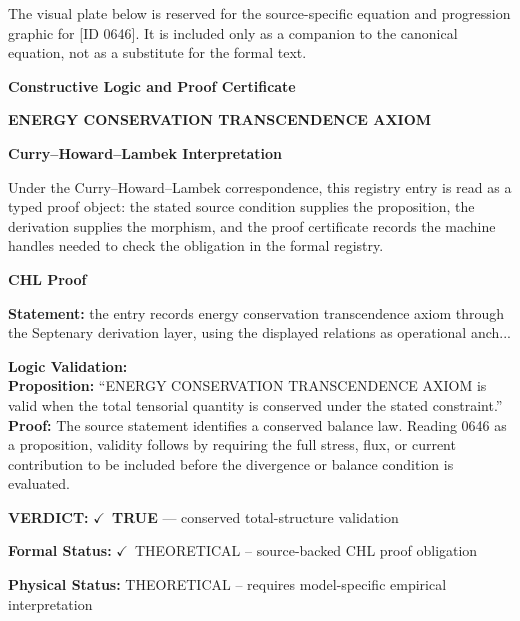 \begingroup\footnotesize\sloppy
The visual plate below is reserved for the source-specific equation and progression graphic for [ID 0646]. It is included only as a companion to the canonical equation, not as a substitute for the formal text.
\par\endgroup
\ifTZPDarkEdition
{}
\fi

\clearpage
\begingroup\tzpsupportsetup
\noindent\textbf{\fontsize{10.8pt}{12.8pt}\selectfont [ID 0646] Constructive Logic and Proof Certificate}\par
\noindent\textbf{\fontsize{10pt}{12pt}\selectfont ENERGY CONSERVATION TRANSCENDENCE AXIOM}\par
\vspace{0.45em}
\begingroup
\footnotesize
\setlength{\parskip}{0.22em}
\setlength{\parindent}{0pt}
\noindent\textbf{Curry--Howard--Lambek Interpretation}\par
Under the Curry--Howard--Lambek correspondence, this registry entry is read as a typed proof
object: the stated source condition supplies the proposition, the derivation supplies the
morphism, and the proof certificate records the machine handles needed to check the obligation
in the formal registry.

\vspace{0.45em}
\noindent\textbf{CHL Proof}\par
\textbf{Statement:} the entry records energy conservation transcendence axiom through the Septenary
derivation layer, using the displayed relations as operational anch...

\textbf{Logic Validation:}\\
\textbf{Proposition:} ``ENERGY CONSERVATION TRANSCENDENCE AXIOM is valid when the total tensorial quantity is
conserved under the stated constraint.''\\
\textbf{Proof:} The source statement identifies a conserved balance law. Reading 0646 as a proposition,
validity follows by requiring the full stress, flux, or current contribution to be
included before the divergence or balance condition is evaluated.

\textbf{VERDICT:} \ensuremath{\checkmark}\ \textbf{TRUE} --- conserved total-structure validation

\textbf{Formal Status:} \ensuremath{\checkmark}\ THEORETICAL -- source-backed CHL proof obligation

\textbf{Physical Status:} THEORETICAL -- requires model-specific empirical interpretation
\par\vspace{0.45em}
\par
\ifTZPDarkEdition
{}
\fi
\endgroup
\endgroup
